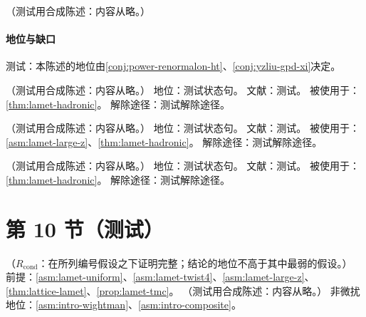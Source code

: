 \begin{proposition}\label{prop:lamet-bvz}
（测试用合成陈述：内容从略。）
\end{proposition}
\paragraph{地位与缺口}测试：本陈述的地位由\cref{conj:power-renormalon-ht}、\cref{conj:yzliu-gpd-xi}决定。

\begin{assumption}\label{asm:lamet-uniform}
（测试用合成陈述：内容从略。）
地位：测试状态句。
文献：测试。
被使用于：\cref{thm:lamet-hadronic}。
解除途径：测试解除途径。
\end{assumption}

\begin{assumption}\label{asm:lamet-twist4}
（测试用合成陈述：内容从略。）
地位：测试状态句。
文献：测试。
被使用于：\cref{asm:lamet-large-z}、\cref{thm:lamet-hadronic}。
解除途径：测试解除途径。
\end{assumption}

\begin{assumption}\label{asm:lamet-large-z}
（测试用合成陈述：内容从略。）
地位：测试状态句。
文献：测试。
被使用于：\cref{thm:lamet-hadronic}。
解除途径：测试解除途径。
\end{assumption}

\section{第 10 节（测试）}\label{sec:lamet-power}

\begin{theorem}\label{thm:lamet-hadronic}
（$R_{\mathrm{cond}}$：在所列编号假设之下证明完整；结论的地位不高于其中最弱的假设。）
前提：\cref{asm:lamet-uniform}、\cref{asm:lamet-twist4}、\cref{asm:lamet-large-z}、\cref{thm:lattice-lamet}、\cref{prop:lamet-tmc}。
（测试用合成陈述：内容从略。）
非微扰地位：\cref{asm:intro-wightman}、\cref{asm:intro-composite}。
\end{theorem}

